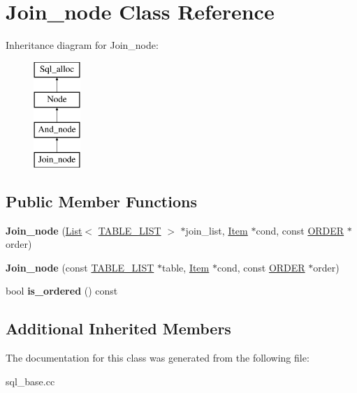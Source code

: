 \hypertarget{classJoin__node}{}\section{Join\+\_\+node Class Reference}
\label{classJoin__node}
Inheritance diagram for Join\+\_\+node\+:\begin{figure}[H]
\begin{center}
\leavevmode
\includegraphics[height=4.000000cm]{classJoin__node}
\end{center}
\end{figure}
\subsection*{Public Member Functions}
\begin{DoxyCompactItemize}
\item 
{\bfseries Join\+\_\+node} (\mbox{\hyperlink{classList}{List}}$<$ \mbox{\hyperlink{structTABLE__LIST}{T\+A\+B\+L\+E\+\_\+\+L\+I\+ST}} $>$ $\ast$join\+\_\+list, \mbox{\hyperlink{classItem}{Item}} $\ast$cond, const \mbox{\hyperlink{structst__order}{O\+R\+D\+ER}} $\ast$order)
\item 
{\bfseries Join\+\_\+node} (const \mbox{\hyperlink{structTABLE__LIST}{T\+A\+B\+L\+E\+\_\+\+L\+I\+ST}} $\ast$table, \mbox{\hyperlink{classItem}{Item}} $\ast$cond, const \mbox{\hyperlink{structst__order}{O\+R\+D\+ER}} $\ast$order)
\item 
bool {\bfseries is\+\_\+ordered} () const
\end{DoxyCompactItemize}
\subsection*{Additional Inherited Members}


The documentation for this class was generated from the following file\+:\begin{DoxyCompactItemize}
\item 
sql\+\_\+base.\+cc\end{DoxyCompactItemize}
